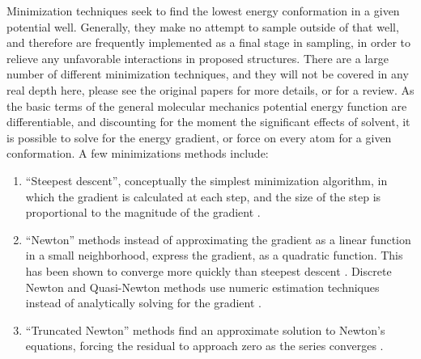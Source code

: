 Minimization techniques seek to find the lowest energy conformation in a given potential well.
Generally, they make no attempt to sample outside of that well, and therefore are frequently implemented as a final stage in sampling, in order to relieve any unfavorable interactions in proposed structures.
There are a large number of different minimization techniques, and they will not be covered in any real depth here, please see the original papers for more details, or \cite{schlick2010molecular} for a review.
As the basic terms of the general molecular mechanics potential energy function are differentiable, and discounting for the moment the significant effects of solvent, it is possible to solve for the energy gradient, or force on every atom for a given conformation.
A few minimizations methods include:
\begin{enumerate}
\item ``Steepest descent'', conceptually the simplest minimization algorithm, in which the gradient is calculated at each step, and the size of the step is proportional to the magnitude of the gradient \cite{levitt1969refinement,bixon1967potential}.
\item ``Newton'' methods instead of approximating the gradient as a linear function in a small neighborhood, express the gradient, as a quadratic function.  This has been shown to converge more quickly than steepest descent \cite{ponder1987efficient}.  
Discrete Newton and Quasi-Newton methods use numeric estimation techniques instead of analytically solving for the gradient \cite{schlick2010molecular}.
\item ``Truncated Newton'' methods find an approximate solution to Newton's equations, forcing the residual to approach zero as the series converges \cite{dembo1983truncated}. 
\end{enumerate}


